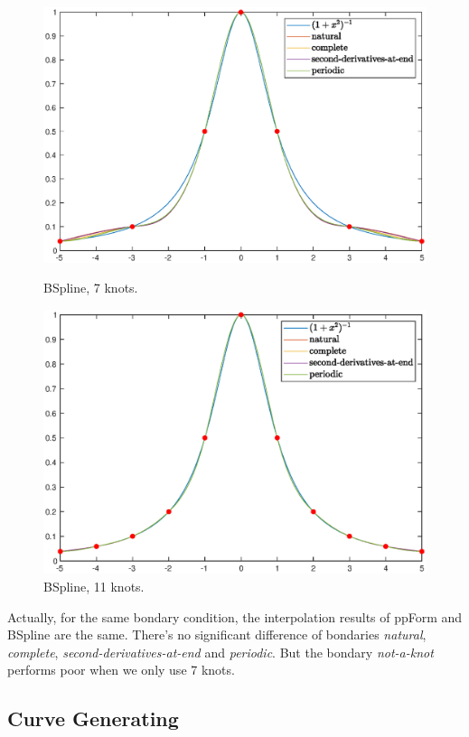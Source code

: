 \documentclass[11pt,en]{elegantpaper}
\begin{document}
\begin{figure}[htbp]
    \begin{minipage}[t]{0.5\linewidth}
        \centering
        \includegraphics[width=0.9\linewidth]{figure/BSpline_7knots.eps}
        \caption{BSpline, 7 knots.}
        \label{fig:side:c}
    \end{minipage}%
    \begin{minipage}[t]{0.5\linewidth}
        \centering
        \includegraphics[width=0.9\linewidth]{figure/BSpline_11knots.eps}
        \caption{BSpline, 11 knots.}
        \label{fig:side:d}
    \end{minipage}
\end{figure}

Actually, for the same bondary condition, the interpolation results of ppForm and BSpline are the same. There's no significant difference of bondaries \textit{natural}, \textit{complete}, \textit{second-derivatives-at-end} and \textit{periodic}. But the bondary \textit{not-a-knot} performs poor when we only use 7 knots. 

\subsection{Curve Generating}
\end{document}
